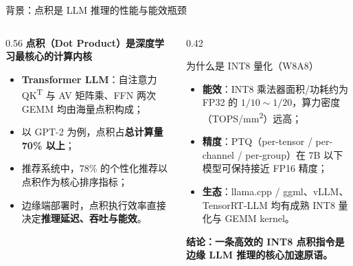 \documentclass[aspectratio=169]{beamer}
\begin{document}
\begin{frame}{背景：点积是 LLM 推理的性能与能效瓶颈}
\begin{columns}[T]
\begin{column}{0.56\textwidth}
\textbf{点积（Dot Product）是深度学习最核心的计算内核}
\begin{itemize}
  \item \textbf{Transformer LLM}：自注意力 QK\textsuperscript{T} 与 AV 矩阵乘、FFN 两次 GEMM 均由海量点积构成；
  \item 以 GPT-2 为例，点积占\textbf{总计算量 70\% 以上}；
  \item 推荐系统中，78\% 的个性化推荐以点积作为核心排序指标；
  \item 边缘端部署时，点积执行效率直接决定\textbf{推理延迟、吞吐与能效}。
\end{itemize}
\end{column}
\begin{column}{0.42\textwidth}
\begin{block}{为什么是 INT8 量化（W8A8）}
\begin{itemize}
  \item \textbf{能效}：INT8 乘法器面积/功耗约为 FP32 的 $1/10\sim1/20$，算力密度（TOPS/mm\textsuperscript{2}）远高；
  \item \textbf{精度}：PTQ（per-tensor / per-channel / per-group）在 7B 以下模型可保持接近 FP16 精度；
  \item \textbf{生态}：llama.cpp / ggml、vLLM、TensorRT-LLM 均有成熟 INT8 量化与 GEMM kernel。
\end{itemize}
\end{block}
\textbf{结论：一条高效的 INT8 点积指令是边缘 LLM 推理的核心加速原语。}
\end{column}
\end{columns}
\end{frame}
\end{document}
